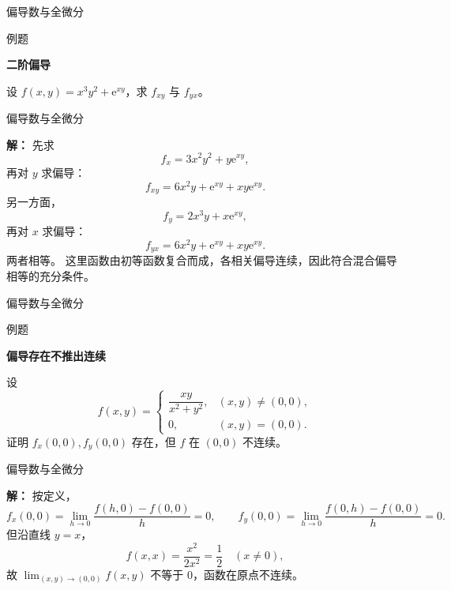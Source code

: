 \documentclass[aspectratio=169,10pt,fontset=fandol]{ctexbeamer}
\newenvironment{warning}{\par\noindent\textbf{注：}\quad}{\par\vspace{0.8em}}
\newcommand{\ee}{\mathrm{e}}
\begin{document}
\begin{frame}[t,fragile]{偏导数与全微分}
\footnotesize
\begin{block}{例题}
{\footnotesize
\textbf{二阶偏导}\par

设 $f(x,y)=x^3y^2+\ee^{xy}$，求 $f_{xy}$ 与 $f_{yx}$。

}
\end{block}
\end{frame}
\begin{frame}[t,fragile]{偏导数与全微分}
\footnotesize
{\footnotesize
\textbf{解：}
先求
\[
f_x=3x^2y^2+y\ee^{xy},
\]
再对 $y$ 求偏导：
\[
f_{xy}=6x^2y+\ee^{xy}+xy\ee^{xy}.
\]
另一方面，
\[
f_y=2x^3y+x\ee^{xy},
\]
再对 $x$ 求偏导：
\[
f_{yx}=6x^2y+\ee^{xy}+xy\ee^{xy}.
\]
两者相等。 这里函数由初等函数复合而成，各相关偏导连续，因此符合混合偏导相等的充分条件。

}
\end{frame}
\begin{frame}[t,fragile]{偏导数与全微分}
\footnotesize
\begin{block}{例题}
{\footnotesize
\textbf{偏导存在不推出连续}\par

设
\[
f(x,y)=
\begin{cases}
\dfrac{xy}{x^2+y^2},&(x,y)\neq(0,0),\\[0.6em]
0,&(x,y)=(0,0).
\end{cases}
\]
证明 $f_x(0,0),f_y(0,0)$ 存在，但 $f$ 在 $(0,0)$ 不连续。

}
\end{block}
\end{frame}
\begin{frame}[t,fragile]{偏导数与全微分}
\footnotesize
{\footnotesize
\textbf{解：}
按定义，
\[
f_x(0,0)=\lim_{h\to0}\frac{f(h,0)-f(0,0)}{h}=0,\qquad
f_y(0,0)=\lim_{h\to0}\frac{f(0,h)-f(0,0)}{h}=0.
\]
但沿直线 $y=x$，
\[
f(x,x)=\frac{x^2}{2x^2}=\frac12\quad(x\neq0),
\]
故 $\lim_{(x,y)\to(0,0)}f(x,y)$ 不等于 $0$，函数在原点不连续。

}
\end{frame}
\end{document}
